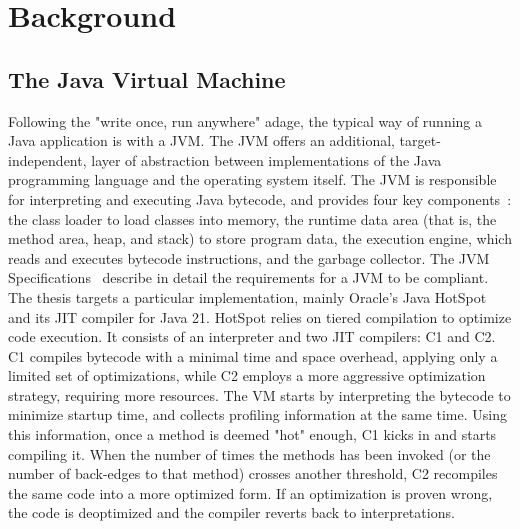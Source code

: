 \chapter{Background}


\section{The Java Virtual Machine}
Following the "write once, run anywhere" adage, the typical way of running a Java application is with a JVM.
The JVM offers an additional, target-independent, layer of abstraction between implementations of the Java programming language and the operating system itself.
The JVM is responsible for interpreting and executing Java bytecode, and provides four key components~\cite{dannarapu_jvm_2023-1}: 
the class loader to load classes into memory, the runtime data area (that is, the method area, heap, and stack) to store program data, the execution engine, which reads and executes bytecode instructions, and the garbage collector. The JVM Specifications~\cite{noauthor_java_nodate-1} describe in detail the requirements for a JVM to be compliant. 
The thesis targets a particular implementation, mainly Oracle's Java HotSpot~\cite{noauthor_hotspot_nodate} and its JIT compiler for Java 21. 
HotSpot relies on tiered compilation to optimize code execution. It consists of an interpreter and two JIT compilers: C1 and C2. 
C1 compiles bytecode with a minimal time and space overhead, applying only a limited set of optimizations, while C2 employs a more aggressive optimization strategy, requiring more resources.
The VM starts by interpreting the bytecode to minimize startup time, and collects profiling information at the same time. Using this information, once a method is deemed "hot" enough, C1 kicks in and starts compiling it. When the number of times the methods has been invoked (or the number of back-edges to that method) crosses another threshold, C2 recompiles the same code into a more optimized form. If an optimization is proven wrong, the code is deoptimized and the compiler reverts back to interpretations.  

